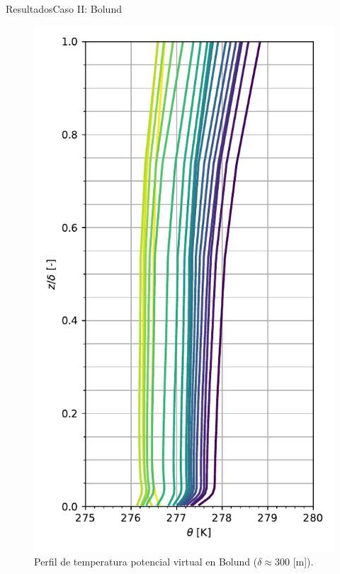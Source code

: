 \documentclass[mathserif,10pt]{beamer}
\begin{document}
\begin{frame}{Resultados}{Caso II: Bolund}
\begin{figure}[H]
\begin{minipage}{0.5\linewidth}
			\includegraphics[width=0.75\linewidth,trim={0cm 5mm 0cm 0cm},clip]{fig/06/bol/mean_profile}%
		\end{minipage}%
		
		\caption{Perfil de temperatura potencial virtual en Bolund ($\delta\approx 300$ [m]).}
		\label{fig:06_bol_pbl}
	\end{figure}
\end{frame}
\end{document}
